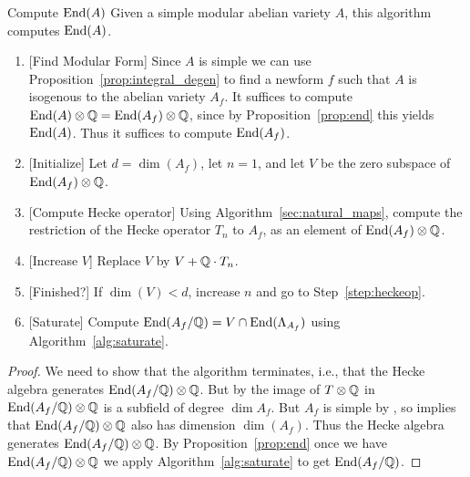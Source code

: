 \documentclass{article}
\begin{document}
\begin{algorithm}{Compute $\operatorname{End}(A)$}
    \label{alg:end_A}
    Given a simple modular abelian variety $A$, this algorithm
    computes $\operatorname{End}(A)$.
    \begin{enumerate}
        \item{} [Find Modular Form] Since $A$ is simple we can use
            Proposition~\ref{prop:integral_degen} to find a newform $f$ such
            that $A$ is isogenous to the abelian variety $A_f$.  It suffices to
            compute $\operatorname{End}(A)\otimes\mathbb{Q} = \operatorname{End}(A_f)\otimes\mathbb{Q}$, since by
            Proposition~\ref{prop:end} this yields $\operatorname{End}(A)$.  Thus it suffices
            to compute $\operatorname{End}(A_f)$.
        \item{} [Initialize] Let $d=\dim(A_f)$, let $n=1$, and let $V$ be the
            zero subspace of $\operatorname{End}(A_f)\otimes\mathbb{Q}$.
        \item{} [Compute Hecke operator]\label{step:heckeop} Using
            Algorithm~\ref{sec:natural_maps}, compute the restriction of the
            Hecke operator $T_n$ to $A_f$, as an element of
            $\operatorname{End}(A_f)\otimes\mathbb{Q}$.
        \item{} [Increase $V$] Replace $V$ by $V+\mathbb{Q}\cdot T_n$.
        \item{} [Finished?]  If $\dim(V) < d$, increase $n$ and go to
            Step~\ref{step:heckeop}.
        \item{} [Saturate] Compute $\operatorname{End}(A_f/\mathbb{Q}) = V \cap \operatorname{End}(\Lambda_{A_f})$
            using Algorithm~\ref{alg:saturate}.
    \end{enumerate}
\end{algorithm}
\begin{proof}
    We need to show that the algorithm terminates, i.e., that the Hecke
    algebra generates $\operatorname{End}(A_f/\mathbb{Q}) \otimes \mathbb{Q}$. But by
    \cite[Thm.~1]{shimura:factors} the image of $T \otimes \mathbb{Q}$ in
    $\operatorname{End}(A_f/\mathbb{Q}) \otimes \mathbb{Q}$ is a subfield of degree $\dim A_f$. But
    $A_f$ is simple by \cite[Cor.~4.2]{ribet:twistsendoalg}, so
    \cite[Thm.~2.1]{ribet:abvars} implies that $\operatorname{End}(A_f/\mathbb{Q}) \otimes \mathbb{Q}$
    also has dimension $\dim(A_f)$. Thus the Hecke algebra generates
    $\operatorname{End}(A_f/\mathbb{Q}) \otimes \mathbb{Q}$. By Proposition~\ref{prop:end} once we
    have $\operatorname{End}(A_f/\mathbb{Q}) \otimes \mathbb{Q}$ we apply Algorithm~\ref{alg:saturate} to get
    $\operatorname{End}(A_f/\mathbb{Q})$.
\end{proof}
\end{document}
